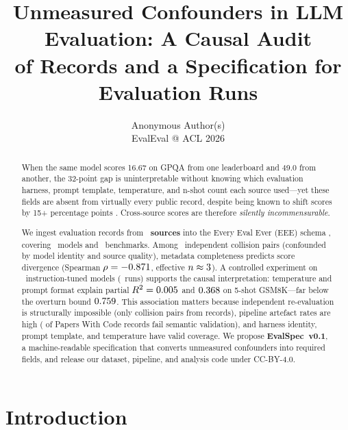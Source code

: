 \documentclass[11pt]{article}
\title{Unmeasured Confounders in LLM Evaluation: A Causal Audit\\
  of \totalrecords{} Records and a Specification for Evaluation Runs}
\author{Anonymous Author(s)\\
  EvalEval @ ACL 2026}
\begin{document}
\maketitle

\begin{abstract}
When the same model scores 16.67 on GPQA from one leaderboard and
49.0 from another, the 32-point gap is uninterpretable without
knowing which evaluation harness, prompt template, temperature, and
n-shot count each source used---yet these fields are absent from
virtually every public record, despite being known to shift scores by
15+ percentage points \citep{alzahrani-2024-benchmarks}. Cross-source
scores are therefore \emph{silently incommensurable}.

We ingest \textbf{\totalrecords{}} evaluation records from
\textbf{\totalsources{}~sources} into the Every Eval Ever (EEE)
schema \citep{evaleval-2026}, covering \totalmodels{}~models and
\totalbenchmarks{}~benchmarks. Among \collisionn{}~independent
collision pairs (confounded by model identity and source quality),
metadata completeness predicts score divergence (Spearman
$\rho = -0.871{}$, effective $n \approx 3{}$). A
controlled experiment on \expmodels{}~instruction-tuned models
(\expruns{}~runs) supports the causal interpretation: temperature
and prompt format explain partial $R^2 = 0.005{}$ and
$0.368{}$ on 5-shot GSM8K---far below the overturn bound
$0.759{}$. This association matters because independent
re-evaluation is structurally impossible (only \collisionpairs{}
collision pairs from \totalrecords{} records), pipeline artefact
rates are high (\pwcartifacts{} of Papers With Code records fail
semantic validation), and harness identity, prompt template, and
temperature have \textbf{\promptcoverage{}} valid coverage. We propose
\textbf{EvalSpec~v0.1}, a machine-readable specification that
converts unmeasured confounders into required fields, and release
our dataset, pipeline, and analysis code under CC-BY-4.0.
\end{abstract}

\section{Introduction}\label{sec:intro}
\end{document}
